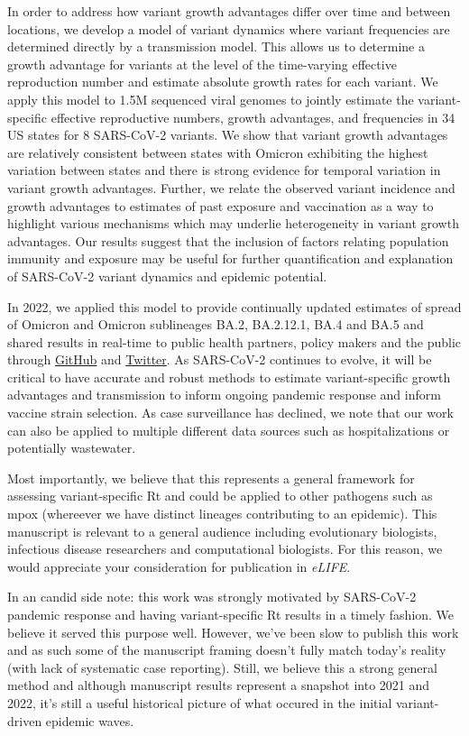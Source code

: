 \documentclass[11pt]{article}
\begin{document}
In order to address how variant growth advantages differ over time and between locations, we develop a model of variant dynamics where variant frequencies are determined directly by a transmission model.
This allows us to determine a growth advantage for variants at the level of the time-varying effective reproduction number and estimate absolute growth rates for each variant.
We apply this model to 1.5M sequenced viral genomes to jointly estimate the variant-specific effective reproductive numbers, growth advantages, and frequencies in 34 US states for 8 SARS-CoV-2 variants.
We show that variant growth advantages are relatively consistent between states with Omicron exhibiting the highest variation between states and there is strong evidence for temporal variation in variant growth advantages.
Further, we relate the observed variant incidence and growth advantages to estimates of past exposure and vaccination as a way to highlight various mechanisms which may underlie heterogeneity in variant growth advantages.
Our results suggest that the inclusion of factors relating population immunity and exposure may be useful for further quantification and explanation of SARS-CoV-2 variant dynamics and epidemic potential.

In 2022, we applied this model to provide continually updated estimates of spread of Omicron and Omicron sublineages BA.2, BA.2.12.1, BA.4 and BA.5 and shared results in real-time to public health partners, policy makers and the public through \href{https://github.com/blab/rt-from-frequency-dynamics}{GitHub} and \href{https://twitter.com/trvrb/status/1530649628625936384}{Twitter}.
As SARS-CoV-2 continues to evolve, it will be critical to have accurate and robust methods to estimate variant-specific growth advantages and transmission to inform ongoing pandemic response and inform vaccine strain selection.
As case surveillance has declined, we note that our work can also be applied to multiple different data sources such as hospitalizations or potentially wastewater.

Most importantly, we believe that this represents a general framework for assessing variant-specific Rt and could be applied to other pathogens such as mpox (whereever we have distinct lineages contributing to an epidemic).
This manuscript is relevant to a general audience including evolutionary biologists, infectious disease researchers and computational biologists.
For this reason, we would appreciate your consideration for publication in \textit{eLIFE}.

In an candid side note: this work was strongly motivated by SARS-CoV-2 pandemic response and having variant-specific Rt results in a timely fashion.
We believe it served this purpose well.
However, we've been slow to publish this work and as such some of the manuscript framing doesn't fully match today's reality (with lack of systematic case reporting).
Still, we believe this a strong general method and although manuscript results represent a snapshot into 2021 and 2022, it's still a useful historical picture of what occured in the initial variant-driven epidemic waves.
\end{document}
